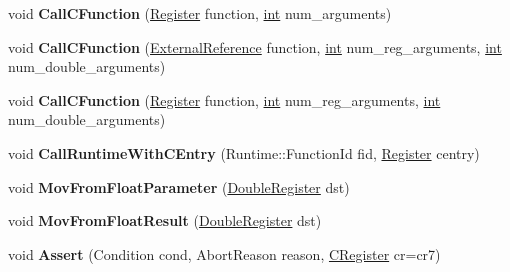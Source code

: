 \begin{DoxyCompactItemize}
void {\bfseries Call\+C\+Function} (\mbox{\hyperlink{classv8_1_1internal_1_1Register}{Register}} function, \mbox{\hyperlink{classint}{int}} num\+\_\+arguments)
\item 
\mbox{\label{classv8_1_1internal_1_1TurboAssembler_abdafca48f4971e28009f86e4ff25de15}} 
void {\bfseries Call\+C\+Function} (\mbox{\hyperlink{classv8_1_1internal_1_1ExternalReference}{External\+Reference}} function, \mbox{\hyperlink{classint}{int}} num\+\_\+reg\+\_\+arguments, \mbox{\hyperlink{classint}{int}} num\+\_\+double\+\_\+arguments)
\item 
\mbox{\label{classv8_1_1internal_1_1TurboAssembler_ac47afd32db8e770d2803e3f116c30e60}} 
void {\bfseries Call\+C\+Function} (\mbox{\hyperlink{classv8_1_1internal_1_1Register}{Register}} function, \mbox{\hyperlink{classint}{int}} num\+\_\+reg\+\_\+arguments, \mbox{\hyperlink{classint}{int}} num\+\_\+double\+\_\+arguments)
\item 
\mbox{\label{classv8_1_1internal_1_1TurboAssembler_a402a6ba1a950da97bcbbf500be586951}} 
void {\bfseries Call\+Runtime\+With\+C\+Entry} (Runtime\+::\+Function\+Id fid, \mbox{\hyperlink{classv8_1_1internal_1_1Register}{Register}} centry)
\item 
\mbox{\label{classv8_1_1internal_1_1TurboAssembler_a3ef3e6f02594d358e3385eac66ceab18}} 
void {\bfseries Mov\+From\+Float\+Parameter} (\mbox{\hyperlink{classv8_1_1internal_1_1DoubleRegister}{Double\+Register}} dst)
\item 
\mbox{\label{classv8_1_1internal_1_1TurboAssembler_aa610efc2002fd48b4cf5062ff040576b}} 
void {\bfseries Mov\+From\+Float\+Result} (\mbox{\hyperlink{classv8_1_1internal_1_1DoubleRegister}{Double\+Register}} dst)
\item 
\mbox{\label{classv8_1_1internal_1_1TurboAssembler_a1938156a2ed6ecfc2916765955149697}} 
void {\bfseries Assert} (Condition cond, Abort\+Reason reason, \mbox{\hyperlink{classv8_1_1internal_1_1CRegister}{C\+Register}} cr=cr7)
\item 
\mbox{\label{classv8_1_1internal_1_1TurboAssembler_a43d218065da2f9f94701048f192a1056}} 

\end{DoxyCompactItemize}
